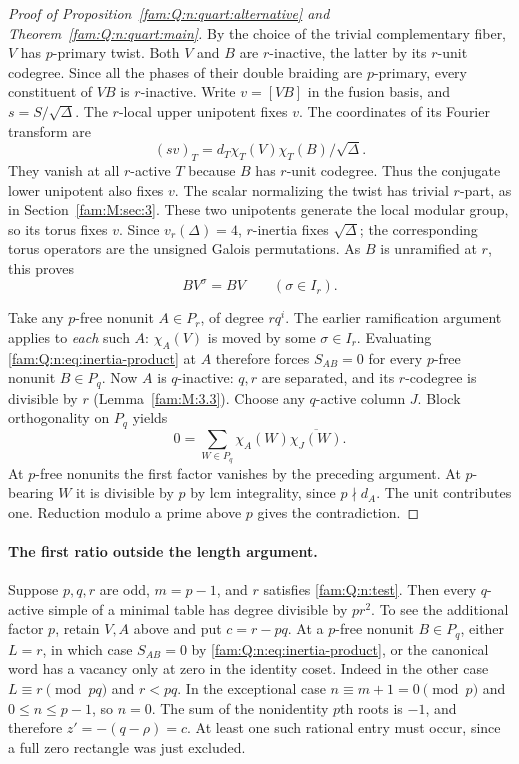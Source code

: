\documentclass[11pt,a4paper]{article}
\numberwithin{equation}{section}
\theoremstyle{remark}
\begin{document}
\begin{proof}[Proof of Proposition~\ref{fam:Q:n:quart:alternative} and Theorem~\ref{fam:Q:n:quart:main}]
By the choice of the trivial complementary fiber, $V$ has $p$-primary twist. Both $V$ and $B$ are
$r$-inactive, the latter by its $r$-unit codegree. Since all the
phases of their double braiding are $p$-primary, every constituent
of $VB$ is $r$-inactive. Write $v=[VB]$ in the fusion basis, and
$s=S/\sqrt\Delta$. The $r$-local upper unipotent fixes $v$.
The coordinates of its Fourier transform are
\[
              (sv)_T=d_T\chi_T(V)\chi_T(B)/\sqrt\Delta .
\]
They vanish at all $r$-active $T$ because $B$ has $r$-unit
codegree. Thus the conjugate lower unipotent also fixes $v$.
The scalar normalizing the twist has trivial $r$-part, as in
Section~\ref{fam:M:sec:3}. These two unipotents generate the local
modular group, so its torus fixes $v$. Since $v_r(\Delta)=4$,
$r$-inertia fixes $\sqrt\Delta$; the corresponding torus
operators are the unsigned Galois permutations.
As $B$ is unramified at $r$, this proves
\begin{equation}
                        BV^\sigma=BV\qquad (\sigma\in I_r).
                        \label{fam:Q:n:eq:inertia-product}
\end{equation}

Take any $p$-free nonunit $A\in P_r$, of degree $rq^i$.
The earlier ramification argument applies to \emph{each} such $A$:
$\chi_A(V)$ is moved by some $\sigma\in I_r$. Evaluating
\eqref{fam:Q:n:eq:inertia-product} at $A$ therefore forces $S_{AB}=0$
for every $p$-free nonunit $B\in P_q$. Now $A$ is $q$-inactive:
$q,r$ are separated, and its $r$-codegree is divisible by $r$
(Lemma~\ref{fam:M:3.3}). Choose any $q$-active column $J$. Block
orthogonality on $P_q$ yields
\[
                    0=\sum_{W\in P_q}\chi_A(W)\overline{\chi_J(W)} .
\]
At $p$-free nonunits the first factor vanishes by the preceding
argument. At $p$-bearing $W$ it is divisible by $p$ by lcm
integrality, since $p\nmid d_A$. The unit contributes one.
Reduction modulo a prime above $p$ gives the contradiction.
\end{proof}

\paragraph{The first ratio outside the length argument.}
Suppose $p,q,r$ are odd, $m=p-1$, and $r$ satisfies \eqref{fam:Q:n:test}.
Then every $q$-active simple of a minimal table has degree divisible
by $pr^2$. To see the additional factor $p$, retain $V,A$ above and
put $c=r-pq$. At a $p$-free nonunit $B\in P_q$, either $L=r$,
in which case $S_{AB}=0$ by \eqref{fam:Q:n:eq:inertia-product}, or
the canonical word has a vacancy only at zero in the identity
coset. Indeed in the other case $L\equiv r\pmod{pq}$ and $r<pq$.
In the exceptional case $n\equiv m+1=0\pmod p$ and
$0\le n\le p-1$, so $n=0$. The sum of the nonidentity $p$th
roots is $-1$, and therefore $z'=-(q-\rho)=c$.
At least one such rational entry must occur, since a full zero
rectangle was just excluded.
\end{document}
